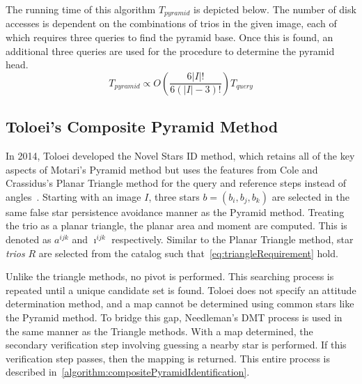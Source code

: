 The running time of this algorithm $T_{pyramid}$ is depicted below.
The number of disk accesses is dependent on the combinations of trios in the given image, each of which requires
three queries to find the pyramid base.
Once this is found, an additional three queries are used for the  procedure to determine the
pyramid head.
\begin{equation}\label{eq:pyramidComplexity}
    T_{pyramid} \propto O\left( \frac{6|I|!}{6 \left( |I| - 3\right)!} \right) T_{query}
\end{equation}

\subsection{Toloei's Composite Pyramid Method}\label{subsec:toloei'sCompositePyramidMethod}
In 2014, Toloei developed the Novel Stars ID method, which retains all of the key aspects of Motari's
Pyramid method but uses the features from Cole and Crassidus's Planar Triangle method for the query and reference steps
instead of angles~\cite{Composite}.
Starting with an image $I$, three stars $b = (b_i, b_j, b_k)$ are selected in the same false star persistence avoidance
manner as the Pyramid method.
Treating the trio as a planar triangle, the planar area and moment are computed.
This is denoted as $a^{ijk}$ and $\imath^{ijk}$ respectively.
Similar to the Planar Triangle method, star \textit{trios} $R$ are selected from the catalog such
that~\autoref{eq:triangleRequirement} hold.

Unlike the triangle methods, no pivot is performed.
This searching process is repeated until a unique candidate set is found.
Toloei does not specify an attitude determination method, and a map cannot be determined using common
stars like the Pyramid method.
To bridge this gap, Needleman's DMT process is used in the same manner as the Triangle methods.
With a map determined, the secondary verification step involving guessing a nearby star is performed.
If this verification step passes, then the mapping is returned.
This entire process is described in~\autoref{algorithm:compositePyramidIdentification}.

